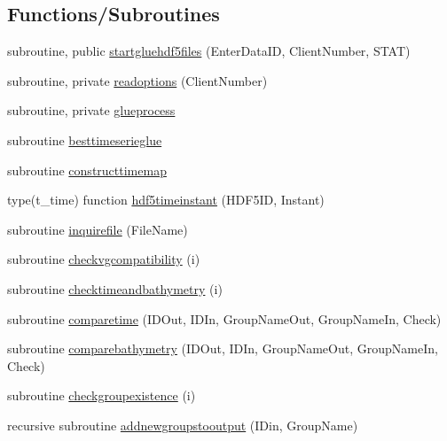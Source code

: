 \subsection*{Functions/\+Subroutines}
\begin{DoxyCompactItemize}
\item 
subroutine, public \mbox{\hyperlink{namespacemodulegluehdf5files_ab2346fccf5401da3d9edc023aaadba24}{startgluehdf5files}} (Enter\+Data\+ID, Client\+Number, S\+T\+AT)
\item 
subroutine, private \mbox{\hyperlink{namespacemodulegluehdf5files_ab3d0b7d8a5a6cb877abaa35b1f974842}{readoptions}} (Client\+Number)
\item 
subroutine, private \mbox{\hyperlink{namespacemodulegluehdf5files_acbfe773d67d0b68688bd5a0cf161456c}{glueprocess}}
\item 
subroutine \mbox{\hyperlink{namespacemodulegluehdf5files_a88e3c5be0d990bbff5725309d8c04656}{besttimeserieglue}}
\item 
subroutine \mbox{\hyperlink{namespacemodulegluehdf5files_a30ae163f5236c7c84af5e6fd552d3da1}{constructtimemap}}
\item 
type(t\+\_\+time) function \mbox{\hyperlink{namespacemodulegluehdf5files_a9a6c2b8f1c89f66fc3308854f2ab8e57}{hdf5timeinstant}} (H\+D\+F5\+ID, Instant)
\item 
subroutine \mbox{\hyperlink{namespacemodulegluehdf5files_a94366c8fe9f21f17f5e9be7a2738a5c1}{inquirefile}} (File\+Name)
\item 
subroutine \mbox{\hyperlink{namespacemodulegluehdf5files_ada0309bfc59c3d5ea77eb5355fff2964}{checkvgcompatibility}} (i)
\item 
subroutine \mbox{\hyperlink{namespacemodulegluehdf5files_a0770b2d20631e91c338f1f9a7db63c8a}{checktimeandbathymetry}} (i)
\item 
subroutine \mbox{\hyperlink{namespacemodulegluehdf5files_a133e090c390fb1c7e840d7fa26500914}{comparetime}} (I\+D\+Out, I\+D\+In, Group\+Name\+Out, Group\+Name\+In, Check)
\item 
subroutine \mbox{\hyperlink{namespacemodulegluehdf5files_affdb072b2fa667663ec2fcf107b11957}{comparebathymetry}} (I\+D\+Out, I\+D\+In, Group\+Name\+Out, Group\+Name\+In, Check)
\item 
subroutine \mbox{\hyperlink{namespacemodulegluehdf5files_a725536a9cfa2982b35ce20a2bd143ad8}{checkgroupexistence}} (i)
\item 
recursive subroutine \mbox{\hyperlink{namespacemodulegluehdf5files_adf08cc960a9d299d5f221e46c1ec20bd}{addnewgroupstooutput}} (I\+Din, Group\+Name)

\end{DoxyCompactItemize}
